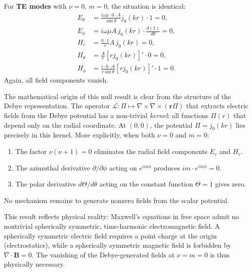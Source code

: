 \documentclass[
  aip,
  amsmath,amssymb,
  preprint
]{revtex4-1}
\begin{document}
For \textbf{TE modes} with $\nu = 0$, $m = 0$, the situation is identical:
\begin{align}
E_\theta &= \frac{i\omega\mu \cdot 0 \cdot A}{\sin\theta} j_0(kr) \cdot 1 = 0, \\[4pt]
E_\phi &= i\omega\mu A \, j_0(kr) \cdot \frac{d(1)}{d\theta} = 0, \\[4pt]
H_r &= \frac{0 \cdot 1}{r} A \, j_0(kr) = 0, \\[4pt]
H_\theta &= \frac{A}{r} [r j_0(kr)]' \cdot 0 = 0, \\[4pt]
H_\phi &= \frac{i \cdot 0 \cdot A}{r\sin\theta} [r j_0(kr)]' \cdot 1 = 0.
\end{align}
Again, all field components vanish. 

The mathematical origin of this null result is clear from the structure of the Debye representation. The operator $\mathcal{L}: \Pi \mapsto \nabla \times \nabla \times (\mathbf{r}\Pi)$ that extracts electric fields from the Debye potential has a non-trivial \emph{kernel}: all functions $\Pi(r)$ that depend only on the radial coordinate. At $(0,0)$, the potential $\Pi = j_0(kr)$ lies precisely in this kernel. More explicitly, when both $\nu = 0$ and $m = 0$:
\begin{enumerate}
\item The factor $\nu(\nu+1) = 0$ eliminates the radial field components $E_r$ and $H_r$.
\item The azimuthal derivative $\partial/\partial\phi$ acting on $e^{im\phi}$ produces $im \cdot e^{im\phi} = 0$.
\item The polar derivative $d\Theta/d\theta$ acting on the constant function $\Theta = 1$ gives zero.
\end{enumerate}
No mechanism remains to generate nonzero fields from the scalar potential.

This result reflects physical reality: Maxwell's equations in free space admit no nontrivial spherically symmetric, time-harmonic electromagnetic field. A spherically symmetric electric field requires a point charge at the origin (electrostatics), while a spherically symmetric magnetic field is forbidden by $\nabla \cdot \mathbf{B} = 0$. The vanishing of the Debye-generated fields at $\nu = m = 0$ is thus physically necessary.
\end{document}
